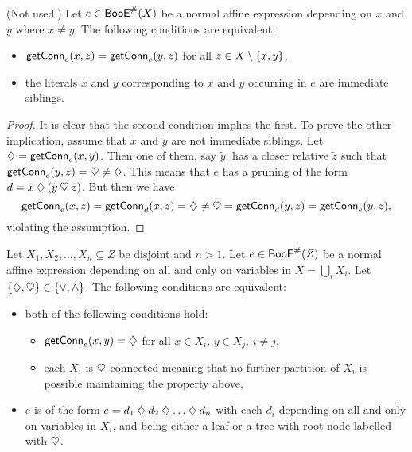 \documentclass[a4paper]{memoir}
\begin{document}
\begin{lemma} \label{thm:bool:char-siblings} (Not used.)
	Let $e \in \mathsf{BooE}^\#(X)$ be a normal affine expression depending on $x$ and $y$ where $x \neq y$.
	The following conditions are equivalent:
	\begin{itemize}
		\item $\mathsf{getConn}_{e}(x, z) = \mathsf{getConn}_{e}(y, z)$ for all $z \in X \setminus \mathopen{}\left\{ x, y \right\}\mathclose{}$,
		\item the literals $\tilde x$ and $\tilde y$ corresponding to $x$ and $y$ occurring in $e$ are immediate siblings.
	\end{itemize}
\end{lemma}
\begin{proof}
	It is clear that the second condition implies the first.
	To prove the other implication, assume that $\tilde x$ and $\tilde y$ are not immediate siblings. Let ${\mathbin{\diamondsuit}} = \mathsf{getConn}_{e}(x, y)$. Then one of them, say $\tilde y$, has a closer relative $\tilde z$ such that $\mathsf{getConn}_{e}(y, z) = {\mathbin{\heartsuit}} \neq {\mathbin{\diamondsuit}}$.
	This means that $e$ has a pruning of the form $d = \tilde x \mathbin{\diamondsuit} (\tilde y \mathbin{\heartsuit} \tilde z)$.
	But then we have
	\[
		\mathsf{getConn}_{e}(x, z) = \mathsf{getConn}_{d}(x, z) = {\mathbin{\diamondsuit}} \neq {\mathbin{\heartsuit}} = \mathsf{getConn}_{d}(y, z) = \mathsf{getConn}_{e}(y, z),
	\]
	violating the assumption.
\end{proof}
\begin{lemma} \label{thm:bool:char-root-node}
	Let $X_1, X_2, \ldots, X_n \subseteq Z$ be disjoint and $n > 1$.
	Let $e \in \mathsf{BooE}^\#(Z)$ be a normal affine expression depending on all and only on variables in $X = \bigcup_i X_i$.
	Let $\mathopen{}\left\{ {\mathbin{\diamondsuit}}, {\mathbin{\heartsuit}} \right\}\mathclose{} \in \mathopen{}\left\{ {\vee}, {\wedge} \right\}\mathclose{}$.
	The following conditions are equivalent:
	\begin{itemize}
		\item both of the following conditions hold:
		\begin{itemize}
			\item $\mathsf{getConn}_{e}(x, y) = \mathbin{\diamondsuit}$ for all $x \in X_i$, $y \in X_j$, $i \neq j$,
			\item each $X_i$ is $\mathbin{\heartsuit}$-connected meaning that no further partition of $X_i$ is possible maintaining the property above,
		\end{itemize}
		\item $e$ is of the form $e = d_1 \mathbin{\diamondsuit} d_2 \mathbin{\diamondsuit} \ldots \mathbin{\diamondsuit} d_n$ with each $d_i$ depending on all and only on variables in $X_i$, and being either a leaf or a tree with root node labelled with $\mathbin{\heartsuit}$.
	\end{itemize}
\end{lemma}
\end{document}

